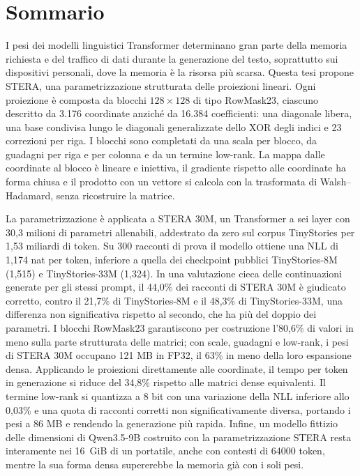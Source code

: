 \chapter*{Sommario}

I pesi dei modelli linguistici Transformer determinano gran parte della memoria richiesta e del traffico di dati durante la generazione del testo, soprattutto sui dispositivi personali, dove la memoria è la risorsa più scarsa. Questa tesi propone STERA, una parametrizzazione strutturata delle proiezioni lineari. Ogni proiezione è composta da blocchi $128\times128$ di tipo RowMask23, ciascuno descritto da 3.176 coordinate anziché da 16.384 coefficienti: una diagonale libera, una base condivisa lungo le diagonali generalizzate dello XOR degli indici e 23 correzioni per riga. I blocchi sono completati da una scala per blocco, da guadagni per riga e per colonna e da un termine low-rank. La mappa dalle coordinate al blocco è lineare e iniettiva, il gradiente rispetto alle coordinate ha forma chiusa e il prodotto con un vettore si calcola con la trasformata di Walsh--Hadamard, senza ricostruire la matrice.

La parametrizzazione è applicata a STERA 30M, un Transformer a sei layer con 30,3 milioni di parametri allenabili, addestrato da zero sul corpus TinyStories per 1,53 miliardi di token. Su 300 racconti di prova il modello ottiene una NLL di 1,174 nat per token, inferiore a quella dei checkpoint pubblici TinyStories-8M (1,515) e TinyStories-33M (1,324). In una valutazione cieca delle continuazioni generate per gli stessi prompt, il 44,0\% dei racconti di STERA 30M è giudicato corretto, contro il 21,7\% di TinyStories-8M e il 48,3\% di TinyStories-33M, una differenza non significativa rispetto al secondo, che ha più del doppio dei parametri. I blocchi RowMask23 garantiscono per costruzione l'80,6\% di valori in meno sulla parte strutturata delle matrici; con scale, guadagni e low-rank, i pesi di STERA 30M occupano 121 MB in FP32, il 63\% in meno della loro espansione densa. Applicando le proiezioni direttamente alle coordinate, il tempo per token in generazione si riduce del 34,8\% rispetto alle matrici dense equivalenti. Il termine low-rank si quantizza a 8 bit con una variazione della NLL inferiore allo 0,03\% e una quota di racconti corretti non significativamente diversa, portando i pesi a 86 MB e rendendo la generazione più rapida. Infine, un modello fittizio delle dimensioni di Qwen3.5-9B costruito con la parametrizzazione STERA resta interamente nei 16~GiB di un portatile, anche con contesti di \num{64000} token, mentre la sua forma densa supererebbe la memoria già con i soli pesi.

